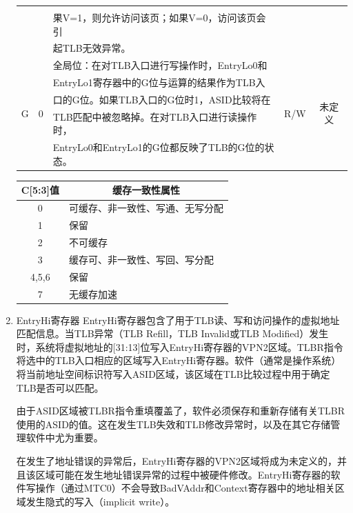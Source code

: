\begin{enumerate}[(1)]
\begin{table}[H]
\begin{tabular}{|c|c|c|c|c|}
&\\
&&
\multicolumn{1}{l|}{果V=1，则允许访问该页；如果V=0，访问该页会引}&
&\\
&&
\multicolumn{1}{l|}{起TLB无效异常。}&
&\\
\hline
\multirow{5}{*}{G}&
\multirow{5}{*}{0}&
\multicolumn{1}{l|}{全局位：在对TLB入口进行写操作时，EntryLo0和}&
\multirow{5}{*}{R/W}&
\multirow{5}{*}{未定义}\\
&&
\multicolumn{1}{l|}{EntryLo1寄存器中的G位与运算的结果作为TLB入}&
&\\
&&
\multicolumn{1}{l|}{口的G位。如果TLB入口的G位时1，ASID比较将在}&
&\\
&&
\multicolumn{1}{l|}{TLB匹配中被忽略掉。在对TLB入口进行读操作时，}&
&\\
&&
\multicolumn{1}{l|}{EntryLo0和EntryLo1的G位都反映了TLB的G位的状态。}&
&\\
\hline
\end{tabular}
\end{table}

\begin{table}[H]
\centering
\begin{tabular}{|c|l|}
\hline
C[5:3]值&
\multicolumn{1}{c|}{缓存一致性属性}\\
\hline
0&可缓存、非一致性、写通、无写分配\\
\hline
1&保留\\
\hline
2&不可缓存\\
\hline
3&缓存可、非一致性、写回、写分配\\
\hline
4,5,6&保留\\
\hline
7&无缓存加速\\
\hline
\end{tabular}
\end{table}

\item EntryHi寄存器
EntryHi寄存器包含了用于TLB读、写和访问操作的虚拟地址匹配信息。当TLB异常（TLB Refill，TLB Invalid或TLB Modified）发生时，系统将虚拟地址的[31:13]位写入EntryHi寄存器的VPN2区域。TLBR指令将选中的TLB入口相应的区域写入EntryHi寄存器。软件（通常是操作系统）将当前地址空间标识符写入ASID区域，该区域在TLB比较过程中用于确定TLB是否可以匹配。

由于ASID区域被TLBR指令重填覆盖了，软件必须保存和重新存储有关TLBR使用的ASID的值。这在发生TLB失效和TLB修改异常时，以及在其它存储管理软件中尤为重要。

在发生了地址错误的异常后，EntryHi寄存器的VPN2区域将成为未定义的，并且该区域可能在发生地址错误异常的过程中被硬件修改。EntryHi寄存器的软件写操作（通过MTC0）不会导致BadVAddr和Context寄存器中的地址相关区域发生隐式的写入（implicit write）。


\end{enumerate}
